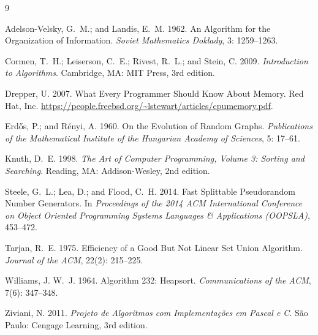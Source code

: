 \documentclass[letterpaper]{article} %
\begin{document}
\begin{thebibliography}{9}
\providecommand{\natexlab}[1]{#1}

Adelson-Velsky, G.~M.; and Landis, E.~M. 1962.
\newblock An Algorithm for the Organization of Information.
\newblock \emph{Soviet Mathematics Doklady}, 3: 1259--1263.

Cormen, T.~H.; Leiserson, C.~E.; Rivest, R.~L.; and Stein, C. 2009.
\newblock \emph{Introduction to Algorithms}.
\newblock Cambridge, MA: MIT Press, 3rd edition.

Drepper, U. 2007.
\newblock What Every Programmer Should Know About Memory.
\newblock Red Hat, Inc. \url{https://people.freebsd.org/~lstewart/articles/cpumemory.pdf}.

Erd{\H{o}}s, P.; and R{\'e}nyi, A. 1960.
\newblock On the Evolution of Random Graphs.
\newblock \emph{Publications of the Mathematical Institute of the Hungarian Academy of Sciences}, 5: 17--61.

Knuth, D.~E. 1998.
\newblock \emph{The Art of Computer Programming, Volume 3: Sorting and Searching}.
\newblock Reading, MA: Addison-Wesley, 2nd edition.

Steele, G.~L.; Lea, D.; and Flood, C.~H. 2014.
\newblock Fast Splittable Pseudorandom Number Generators.
\newblock In \emph{Proceedings of the 2014 ACM International Conference on Object Oriented Programming Systems Languages \& Applications (OOPSLA)}, 453--472.

Tarjan, R.~E. 1975.
\newblock Efficiency of a Good But Not Linear Set Union Algorithm.
\newblock \emph{Journal of the ACM}, 22(2): 215--225.

Williams, J. W.~J. 1964.
\newblock Algorithm 232: Heapsort.
\newblock \emph{Communications of the ACM}, 7(6): 347--348.

Ziviani, N. 2011.
\newblock \emph{Projeto de Algoritmos com Implementa{\c{c}}{\~o}es em Pascal e C}.
\newblock S{\~a}o Paulo: Cengage Learning, 3rd edition.

\end{thebibliography}
\end{document}
